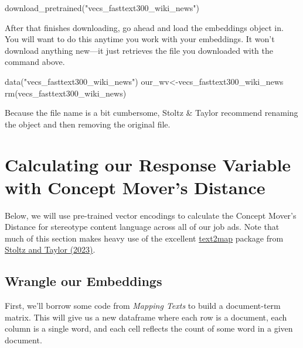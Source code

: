 \documentclass[
  letterpaper,
  DIV=11,
  numbers=noendperiod]{scrreprt}
\newenvironment{Shaded}{\begin{snugshade}}{\end{snugshade}}
\newcommand{\FunctionTok}[1]{\textcolor[rgb]{0.28,0.35,0.67}{#1}}
\newcommand{\NormalTok}[1]{\textcolor[rgb]{0.00,0.23,0.31}{#1}}
\newcommand{\OtherTok}[1]{\textcolor[rgb]{0.00,0.23,0.31}{#1}}
\newcommand{\StringTok}[1]{\textcolor[rgb]{0.13,0.47,0.30}{#1}}
\begin{document}
\begin{Shaded}
\begin{Highlighting}[]
\FunctionTok{download\_pretrained}\NormalTok{(}\StringTok{"vecs\_fasttext300\_wiki\_news"}\NormalTok{)}
\end{Highlighting}
\end{Shaded}

After that finishes downloading, go ahead and load the embeddings object
in. You will want to do this anytime you work with your embeddings. It
won't download anything new---it just retrieves the file you downloaded
with the command above.

\begin{Shaded}
\begin{Highlighting}[]
\FunctionTok{data}\NormalTok{(}\StringTok{"vecs\_fasttext300\_wiki\_news"}\NormalTok{)}
\NormalTok{our\_wv}\OtherTok{\textless{}{-}}\NormalTok{vecs\_fasttext300\_wiki\_news}
\FunctionTok{rm}\NormalTok{(vecs\_fasttext300\_wiki\_news)}
\end{Highlighting}
\end{Shaded}

Because the file name is a bit cumbersome, Stoltz \& Taylor recommend
renaming the object and then removing the original file.

\section{Calculating our Response Variable with Concept Mover's
Distance}\label{calculating-our-response-variable-with-concept-movers-distance}

Below, we will use pre-trained vector encodings to calculate the Concept
Mover's Distance for stereotype content language across all of our job
ads. Note that much of this section makes heavy use of the excellent
\href{https://culturalcartography.gitlab.io/text2map/}{text2map} package
from
\href{https://global.oup.com/academic/product/mapping-texts-9780197756881?cc=us&lang=en&}{Stoltz
and Taylor (2023)}.

\subsection{Wrangle our Embeddings}\label{wrangle-our-embeddings}

First, we'll borrow some code from \emph{Mapping Texts} to build a
document-term matrix. This will give us a new dataframe where each row
is a document, each column is a single word, and each cell reflects the
count of some word in a given document.
\end{document}
